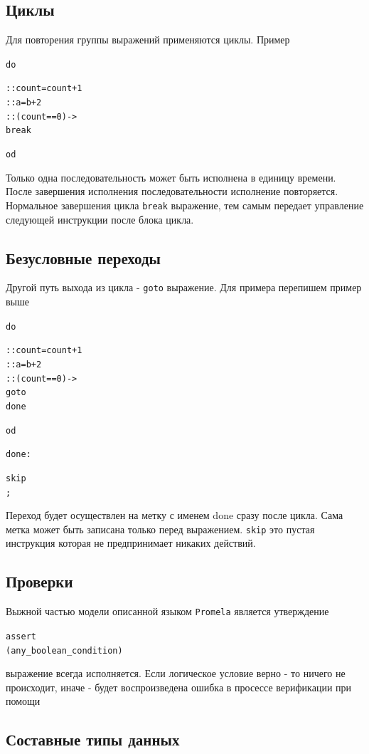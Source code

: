 \documentclass[12pt, twoside]{report}
\newcommand{\cname}[1] {
\textcolor{atnotation}{#1}
}
\begin{document}
\subsection*{Циклы}\label{promela_language_LOOP}

Для повторения группы выражений применяются циклы. Пример
\begin{alltt}
\cname{do}
  :: count = count + 1
  :: a = b + 2
  :: (count == 0) -> \cname{break}
\cname{od}
\end{alltt}
Только одна последовательность может быть исполнена в единицу времени. После
завершения исполнения последовательности исполнение повторяется. Нормальное
завершения цикла \texttt{break} выражение, тем самым передает управление следующей
инструкции после блока цикла.

\subsection*{Безусловные переходы}\label{promela_language_GOTO}

Другой путь выхода из цикла - \texttt{goto} выражение. Для примера перепишем пример выше
\begin{alltt}
\cname{do}
  :: count = count + 1
  :: a = b + 2
  :: (count == 0) -> \cname{goto} done
\cname{od}
done:
  \cname{skip};
\end{alltt}
Переход будет осуществлен на метку с именем done сразу после цикла. Сама метка
может быть записана только перед выражением. \texttt{skip} это пустая инструкция которая
не предпринимает никаких действий.


\subsection*{Проверки}\label{promela_language_ASSERT}

Выжной частью модели описанной языком \texttt{Promela} является утверждение
\begin{alltt}
\cname{assert}(any_boolean_condition)
\end{alltt}
выражение всегда исполняется. Если логическое условие верно - то ничего не
происходит, иначе - будет воспроизведена ошибка в просессе верификации
 при помощи 

\subsection*{Составные типы данных}\label{promela_language_STRUCT}
\end{document}

